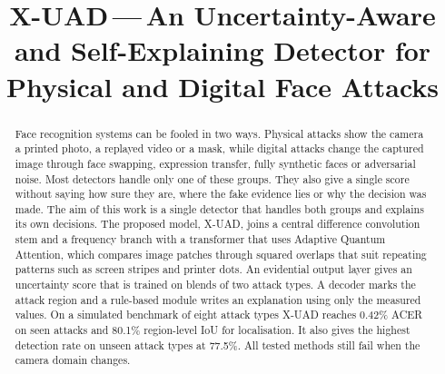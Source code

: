 \documentclass[conference]{IEEEtran}
\begin{document}
\title{X-UAD\,---\,An Uncertainty-Aware and Self-Explaining Detector for
Physical and Digital Face Attacks}

\author{%
\and
{}
\and
{}
}

\maketitle

\begin{abstract}
Face recognition systems can be fooled in two ways. Physical attacks show the camera
a printed photo, a replayed video or a mask, while digital attacks change the
captured image through face swapping, expression transfer, fully synthetic faces or
adversarial noise. Most detectors handle only one of these groups. They also give a
single score without saying how sure they are, where the fake evidence lies or why
the decision was made. The aim of this work is a single detector that handles both
groups and explains its own decisions. The proposed model, X-UAD, joins a central
difference convolution stem and a frequency branch with a transformer that uses
Adaptive Quantum Attention, which compares image patches through squared overlaps
that suit repeating patterns such as screen stripes and printer dots. An evidential
output layer gives an uncertainty score that is trained on blends of two attack
types. A decoder marks the attack region and a rule-based module writes an
explanation using only the measured values. On a simulated benchmark of eight attack
types X-UAD reaches 0.42\% ACER on seen attacks and 80.1\% region-level IoU for
localisation. It also gives the highest detection rate on unseen attack types at
77.5\%. All tested methods still fail when the camera domain changes.
\end{abstract}
\end{document}
